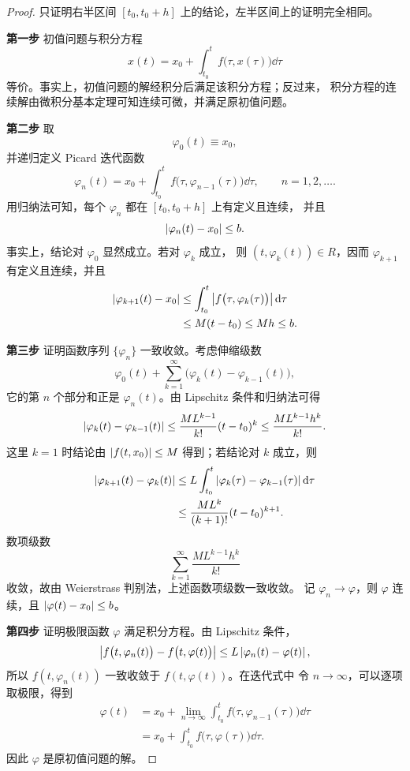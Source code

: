 \begin{proof}
	只证明右半区间 $[t_0,t_0+h]$ 上的结论，左半区间上的证明完全相同。

	\noindent\textbf{第一步}\quad
	初值问题与积分方程
	\[
		x(t)=x_0+\int_{t_0}^{t}f\bigl(\tau,x(\tau)\bigr)\dd\tau
	\]
	等价。事实上，初值问题的解经积分后满足该积分方程；反过来，
	积分方程的连续解由微积分基本定理可知连续可微，并满足原初值问题。

	\noindent\textbf{第二步}\quad
	取
	\[
		\varphi_0(t)\equiv x_0,
	\]
	并递归定义 Picard 迭代函数
	\[
		\varphi_n(t)
		=x_0+\int_{t_0}^{t}
		f\bigl(\tau,\varphi_{n-1}(\tau)\bigr)\dd\tau,
		\qquad n=1,2,\ldots.
	\]
	用归纳法可知，每个 $\varphi_n$ 都在 $[t_0,t_0+h]$ 上有定义且连续，
	并且
	\[
		\left| \varphi_n(t)-x_0 \right|\leq b.
	\]
	事实上，结论对 $\varphi_0$ 显然成立。若对 $\varphi_k$ 成立，
	则 $(t,\varphi_k(t))\in R$，因而 $\varphi_{k+1}$ 有定义且连续，并且
	\[
		\begin{aligned}
			\left| \varphi_{k+1}(t)-x_0 \right|
			&\leq\int_{t_0}^{t}
			\left| f\bigl(\tau,\varphi_k(\tau)\bigr) \right|\mathrm{d}\tau\\
			&\leq M(t-t_0)
			\leq Mh
			\leq b.
		\end{aligned}
	\]

	\noindent\textbf{第三步}\quad
	证明函数序列 $\{\varphi_n\}$ 一致收敛。考虑伸缩级数
	\[
		\varphi_0(t)
		+\sum_{k=1}^{\infty}
		\bigl(\varphi_k(t)-\varphi_{k-1}(t)\bigr),
	\]
	它的第 $n$ 个部分和正是 $\varphi_n(t)$。由 Lipschitz 条件和归纳法可得
	\[
		\left| \varphi_k(t)-\varphi_{k-1}(t) \right|
		\leq
		\dfrac{ML^{k-1}}{k!}(t-t_0)^k
		\leq
		\dfrac{ML^{k-1}h^k}{k!}.
	\]
	这里 $k=1$ 时结论由 $\left| f(t,x_0) \right|\leq M$ 得到；若结论对 $k$
	成立，则
	\[
		\begin{aligned}
			\left| \varphi_{k+1}(t)-\varphi_k(t) \right|
			&\leq L\int_{t_0}^{t}
			\left| \varphi_k(\tau)-\varphi_{k-1}(\tau) \right|\mathrm{d}\tau\\
			&\leq
			\dfrac{ML^k}{(k+1)!}(t-t_0)^{k+1}.
		\end{aligned}
	\]
	数项级数
	\[
		\sum_{k=1}^{\infty}\dfrac{ML^{k-1}h^k}{k!}
	\]
	收敛，故由 Weierstrass 判别法，上述函数项级数一致收敛。
	记 $\varphi_n\to\varphi$，则 $\varphi$ 连续，且
	$\left| \varphi(t)-x_0 \right|\leq b$。

	\noindent\textbf{第四步}\quad
	证明极限函数 $\varphi$ 满足积分方程。由 Lipschitz 条件，
	\[
		\left| 
			f\bigl(t,\varphi_n(t)\bigr)
			-f\bigl(t,\varphi(t)\bigr)
		 \right|
		\leq L\left| \varphi_n(t)-\varphi(t) \right|,
	\]
	所以 $f(t,\varphi_n(t))$ 一致收敛于 $f(t,\varphi(t))$。在迭代式中
	令 $n\to\infty$，可以逐项取极限，得到
	\[
		\begin{aligned}
			\varphi(t)
			&=x_0+\lim_{n\to\infty}
			\int_{t_0}^{t}
			f\bigl(\tau,\varphi_{n-1}(\tau)\bigr)\dd\tau\\
			&=x_0+\int_{t_0}^{t}
			f\bigl(\tau,\varphi(\tau)\bigr)\dd\tau.
		\end{aligned}
	\]
	因此 $\varphi$ 是原初值问题的解。


\end{proof}
